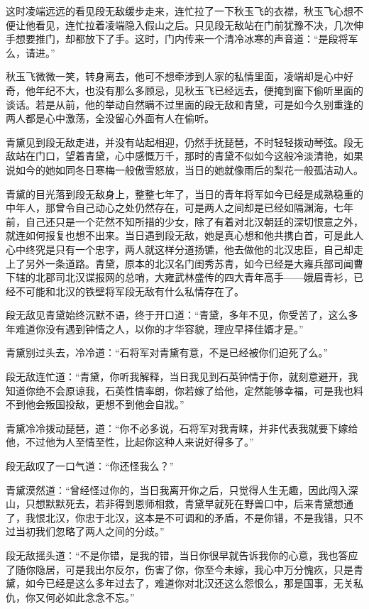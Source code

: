 这时凌端远远的看见段无敌缓步走来，连忙拉了一下秋玉飞的衣襟，秋玉飞心想不便让他看见，连忙拉着凌端隐入假山之后。只见段无敌站在门前犹豫不决，几次伸手想要推门，却都放下了手。这时，门内传来一个清冷冰寒的声音道：“是段将军么，请进。”

秋玉飞微微一笑，转身离去，他可不想牵涉到人家的私情里面，凌端却是心中好奇，他年纪不大，也没有那么多顾忌，见秋玉飞已经远去，便掩到窗下偷听里面的谈话。若是从前，他的举动自然瞒不过里面的段无敌和青黛，可是如今久别重逢的两人都是心中激荡，全没留心外面有人在偷听。

青黛见到段无敌走进，并没有站起相迎，仍然手抚琵琶，不时轻轻拨动琴弦。段无敌站在门口，望着青黛，心中感慨万千，那时的青黛不似如今这般冷淡清艳，如果说如今的她如同冬日寒梅一般傲雪怒放，当日的她就像雨后的梨花一般孤洁动人。

青黛的目光落到段无敌身上，整整七年了，当日的青年将军如今已经是成熟稳重的中年人，那曾令自己动心之处仍然存在，可是两人之间却是已经如隔渊海，七年前，自己还只是一个茫然不知所措的少女，除了有着对北汉朝廷的深切恨意之外，就连如何报复也想不出来。当日遇到段无敌，她是真心想和他共携白首，可是此人心中终究是只有一个忠字，两人就这样分道扬镳，他去做他的北汉忠臣，自己却走上了另外一条道路。青黛，原本的北汉名门闺秀苏青，如今已经是大雍兵部司闻曹下辖的北郡司北汉谍报网的总哨，大雍武林盛传的四大青年高手——娥眉青衫，已经不可能和北汉的铁壁将军段无敌有什么私情存在了。

段无敌见青黛始终沉默不语，终于开口道：“青黛，多年不见，你受苦了，这么多年难道你没有遇到钟情之人，以你的才华容貌，理应早择佳婿才是。”

青黛别过头去，冷冷道：“石将军对青黛有意，不是已经被你们迫死了么。”

段无敌连忙道：“青黛，你听我解释，当日我见到石英钟情于你，就刻意避开，我知道你绝不会原谅我，石英性情率朗，你若嫁了给他，定然能够幸福，可是我也料不到他会叛国投敌，更想不到他会自戕。”

青黛冷冷拨动琵琶，道：“你不必多说，石将军对我青睐，并非代表我就要下嫁给他，不过他为人至情至性，比起你这种人来说好得多了。”

段无敌叹了一口气道：“你还怪我么？”

青黛漠然道：“曾经怪过你的，当日我离开你之后，只觉得人生无趣，因此闯入深山，只想默默死去，若非得到恩师相救，青黛早就死在野兽口中，后来青黛想通了，我恨北汉，你忠于北汉，这本是不可调和的矛盾，不是你错，不是我错，只不过当初我们忽略了两人之间的分歧。”

段无敌摇头道：“不是你错，是我的错，当日你很早就告诉我你的心意，我也答应了随你隐居，可是我出尔反尔，伤害了你，你至今未嫁，我心中万分愧疚，只是青黛，如今已经是这么多年过去了，难道你对北汉还这么怨恨么，那是国事，无关私仇，你又何必如此念念不忘。”

